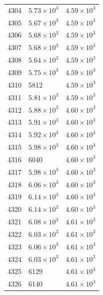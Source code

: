 \begin{table}[H]
\begin{tabular}{lll}
4304 & $\displaystyle 5.73 \times 10^{3}$ & $\displaystyle 4.59 \times 10^{3}$ \\
4305 & $\displaystyle 5.67 \times 10^{3}$ & $\displaystyle 4.59 \times 10^{3}$ \\
4306 & $\displaystyle 5.68 \times 10^{3}$ & $\displaystyle 4.59 \times 10^{3}$ \\
4307 & $\displaystyle 5.68 \times 10^{3}$ & $\displaystyle 4.59 \times 10^{3}$ \\
4308 & $\displaystyle 5.64 \times 10^{3}$ & $\displaystyle 4.59 \times 10^{3}$ \\
4309 & $\displaystyle 5.75 \times 10^{3}$ & $\displaystyle 4.59 \times 10^{3}$ \\
4310 & 5812 & $\displaystyle 4.59 \times 10^{3}$ \\
4311 & $\displaystyle 5.81 \times 10^{3}$ & $\displaystyle 4.59 \times 10^{3}$ \\
4312 & $\displaystyle 5.88 \times 10^{3}$ & $\displaystyle 4.60 \times 10^{3}$ \\
4313 & $\displaystyle 5.91 \times 10^{3}$ & $\displaystyle 4.60 \times 10^{3}$ \\
4314 & $\displaystyle 5.92 \times 10^{3}$ & $\displaystyle 4.60 \times 10^{3}$ \\
4315 & $\displaystyle 5.98 \times 10^{3}$ & $\displaystyle 4.60 \times 10^{3}$ \\
4316 & 6040 & $\displaystyle 4.60 \times 10^{3}$ \\
4317 & $\displaystyle 5.98 \times 10^{3}$ & $\displaystyle 4.60 \times 10^{3}$ \\
4318 & $\displaystyle 6.06 \times 10^{3}$ & $\displaystyle 4.60 \times 10^{3}$ \\
4319 & $\displaystyle 6.14 \times 10^{3}$ & $\displaystyle 4.60 \times 10^{3}$ \\
4320 & $\displaystyle 6.14 \times 10^{3}$ & $\displaystyle 4.60 \times 10^{3}$ \\
4321 & $\displaystyle 6.08 \times 10^{3}$ & $\displaystyle 4.61 \times 10^{3}$ \\
4322 & $\displaystyle 6.03 \times 10^{3}$ & $\displaystyle 4.61 \times 10^{3}$ \\
4323 & $\displaystyle 6.06 \times 10^{3}$ & $\displaystyle 4.61 \times 10^{3}$ \\
4324 & $\displaystyle 6.03 \times 10^{3}$ & $\displaystyle 4.61 \times 10^{3}$ \\
4325 & 6129 & $\displaystyle 4.61 \times 10^{3}$ \\
4326 & 6140 & $\displaystyle 4.61 \times 10^{3}$ \\

\end{tabular}
\end{table}
